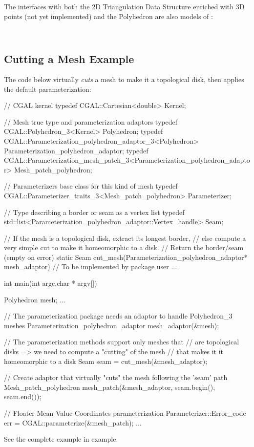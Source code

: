 The  interfaces with both the 2D
Triangulation Data Structure enriched with 3D points (not yet
implemented) and the Polyhedron are also models of
:

  \\


\subsection{Cutting a Mesh Example}

The code below virtually {\em cuts} a  mesh to make
it a topological disk, then applies the default parameterization:

\begin{ccExampleCode}

// CGAL kernel
typedef CGAL::Cartesian<double>                             Kernel;

// Mesh true type and parameterization adaptors
typedef CGAL::Polyhedron_3<Kernel>                          Polyhedron;
typedef CGAL::Parameterization_polyhedron_adaptor_3<Polyhedron>         
                                                            Parameterization_polyhedron_adaptor;
typedef CGAL::Parameterization_mesh_patch_3<Parameterization_polyhedron_adaptor> 
                                                            Mesh_patch_polyhedron;

// Parameterizers base class for this kind of mesh
typedef CGAL::Parameterizer_traits_3<Mesh_patch_polyhedron> Parameterizer;

// Type describing a border or seam as a vertex list
typedef std::list<Parameterization_polyhedron_adaptor::Vertex_handle>   
                                                            Seam;

// If the mesh is a topological disk, extract its longest border,
// else compute a very simple cut to make it homeomorphic to a disk.
// Return the border/seam (empty on error)
static Seam cut_mesh(Parameterization_polyhedron_adaptor* mesh_adaptor)
{
    // To be implemented by package user
    ...
}

int main(int argc,char * argv[])
{
    Polyhedron mesh;
    ...

    // The parameterization package needs an adaptor to handle Polyhedron_3 meshes
    Parameterization_polyhedron_adaptor mesh_adaptor(&mesh);

    // The parameterization methods support only meshes that
    // are topological disks => we need to compute a "cutting" of the mesh
    // that makes it it homeomorphic to a disk
    Seam seam = cut_mesh(&mesh_adaptor);

    // Create adaptor that virtually "cuts" the mesh following the 'seam' path
    Mesh_patch_polyhedron   mesh_patch(&mesh_adaptor,
                                       seam.begin(),
                                       seam.end());

    // Floater Mean Value Coordinates parameterization
    Parameterizer::Error_code err = CGAL::parameterize(&mesh_patch);
    ...
}

\end{ccExampleCode}

See the complete example in 
example.


